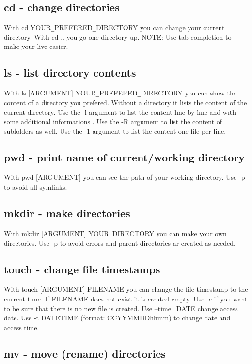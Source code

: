 \documentclass[10pt,a4paper]{scrartcl}
\begin{document}
\subsection{cd - change directories}

With cd YOUR\verb$_$PREFERED\verb$_$DIRECTORY you can change your current directory. With cd .. you go one directory up. NOTE: Use tab-completion to make your live easier.

\subsection{ls - list directory contents}

With ls [ARGUMENT] YOUR\verb$_$PREFERED\verb$_$DIRECTORY you can show the content of a directory you prefered. Without a directory it lists the content of the current directory. Use the -l argument to list the content line by line and with some additional informations . Use the -R argument to list the content of subfolders as well. Use the -1 argument to list the content one file per line. 

\subsection{pwd - print name of current/working directory}

With pwd [ARGUMENT] you can see the path of your working directory. Use -p to avoid all symlinks.

\subsection{mkdir - make directories}

With mkdir [ARGUMENT] YOUR\verb$_$DIRECTORY you can make your own directories. Use -p to avoid errors and parent directories ar created as needed.

\subsection{touch - change file timestamps}

With touch [ARGUMENT] FILENAME you can change the file timestamp to the current time. If FILENAME does not exist it is created empty. Use -c if you want to be sure that there is no new file is created. Use --time=DATE change access date. Use -t DATETIME (format: CCYYMMDDhhmm) to change date and access time.

\subsection{mv - move (rename) directories}
\end{document}

